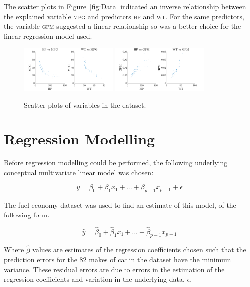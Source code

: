\documentclass[a4paper,10pt,twocolumn]{article}
\newcommand{\MPG}{\textsc{mpg}\xspace}
\newcommand{\GPM}{\textsc{gpm}\xspace}
\newcommand{\HP}{\textsc{hp}\xspace}
\newcommand{\WT}{\textsc{wt}\xspace}
\begin{document}
The scatter plots in Figure~\vref{fig:Data} indicated an inverse relationship 
between the explained variable \MPG and predictors \HP and \WT. For the same 
predictors, the variable \GPM suggested a linear relationship so was a 
better choice for the linear regression model used.

\begin{figure}[h]
    \centering
    \includegraphics[width=0.42\textwidth]{MPG}
    \includegraphics[width=0.42\textwidth]{GPM}
    \caption{Scatter plots of variables in the dataset.}
    \label{fig:Data}
\end{figure}

\section{Regression Modelling}

Before regression modelling could be performed, the following underlying 
conceptual multivariate linear model was chosen:

\begin{equation}
    y = \beta_0 + \beta_1 x_1 + ... + \beta_{p-1}x_{p-1} + \epsilon
    \label{eq:Model}
\end{equation}

The fuel economy dataset was used to find an estimate of this model, of the 
following form:

\begin{equation}
    \hat{y} = \hat{\beta}_0 + \hat{\beta}_1 x_1 + ... + \hat{\beta}_{p-1}x_{p-1}
    \label{eq:Estimate}
\end{equation}

Where $\hat{\beta}$ values are estimates of the regression coefficients chosen 
such that the prediction errors for the 82 makes of car in the dataset have the 
minimum variance. These residual errors are due to errors in the estimation of 
the regression coefficients and variation in the underlying data, $\epsilon$.
\end{document}
